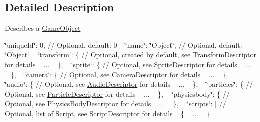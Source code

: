 \subsection{Detailed Description}
Describes a \hyperlink{class_mason_1_1_game_object}{Game\+Object} ~\newline
 

\char`\"{}unique\+Id\char`\"{}\+: 0, // Optional, default\+: 0 ~\newline
 \char`\"{}name\char`\"{}\+: \char`\"{}\+Object\char`\"{}, // Optional, default\+: \char`\"{}\+Object\char`\"{} ~\newline
 \char`\"{}transform\char`\"{}\+: \{ // Optional, created by default, see \hyperlink{class_mason_1_1_transform_descriptor}{Transform\+Descriptor} for details ~\newline
 ... ~\newline
 \}, ~\newline
 \char`\"{}sprite\char`\"{}\+: \{ // Optional, see \hyperlink{class_mason_1_1_sprite_descriptor}{Sprite\+Descriptor} for details ~\newline
 ... ~\newline
 \}, ~\newline
 \char`\"{}camera\char`\"{}\+: \{ // Optional, see \hyperlink{class_mason_1_1_camera_descriptor}{Camera\+Descriptor} for details ~\newline
 ... ~\newline
 \}, ~\newline
 \char`\"{}audio\char`\"{}\+: \{ // Optional, see \hyperlink{class_mason_1_1_audio_descriptor}{Audio\+Descriptor} for details ~\newline
 ... ~\newline
 \}, ~\newline
 \char`\"{}particles\char`\"{}\+: \{ // Optional, see \hyperlink{class_mason_1_1_particle_descriptor}{Particle\+Descriptor} for details ~\newline
 ... ~\newline
 \}, ~\newline
 \char`\"{}physicsbody\char`\"{}\+: \{ // Optional, see \hyperlink{class_mason_1_1_physics_body_descriptor}{Physics\+Body\+Descriptor} for details ~\newline
 ... ~\newline
 \}, ~\newline
 \char`\"{}scripts\char`\"{}\+: \mbox{[} // Optional, list of \hyperlink{class_mason_1_1_script}{Script}, see \hyperlink{class_mason_1_1_script_descriptor}{Script\+Descriptor} for details ~\newline
 \{ ~\newline
 ... ~\newline
 \} ~\newline
 \mbox{]} 

